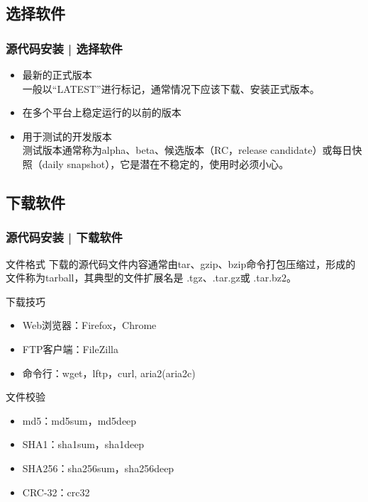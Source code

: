 \subsection{选择软件}
\begin{frame}
  \frametitle{源代码安装 | 选择软件}
  \begin{itemize}
    \item 最新的正式版本\\
      一般以“LATEST”进行标记，通常情况下应该下载、安装正式版本。
    \item 在多个平台上稳定运行的以前的版本
    \item 用于测试的开发版本\\
      测试版本通常称为alpha、beta、候选版本（RC，release candidate）或每日快照（daily snapshot），它是潜在不稳定的，使用时必须小心。
  \end{itemize}
\end{frame}

\subsection{下载软件}
\begin{frame}
  \frametitle{源代码安装 | 下载软件}
  \begin{block}{文件格式}
    下载的源代码文件内容通常由tar、gzip、bzip命令打包压缩过，形成的文件称为tarball，其典型的文件扩展名是 .tgz、.tar.gz或 .tar.bz2。
  \end{block}
  \pause
  \begin{block}{下载技巧}
    \begin{itemize}
      \item Web浏览器：Firefox，Chrome
      \item FTP客户端：FileZilla
      \item 命令行：wget，lftp，curl, aria2(aria2c)
    \end{itemize}
  \end{block}
  \pause
  \begin{block}{文件校验}
    \begin{itemize}
      \item md5：md5sum，md5deep
      \item SHA1：sha1sum，sha1deep
      \item SHA256：sha256sum，sha256deep
      \item CRC-32：crc32
    \end{itemize}
  \end{block}
\end{frame}

